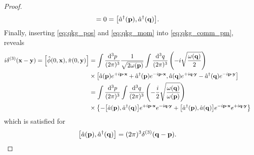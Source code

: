 \begin{proof}
\begin{equation*}
		=
		0
		=
		\comm{\hat{a}^\dagger(\vb{p})}{\hat{a}^\dagger(\vb{q})}
		.
	\end{equation*}
	Finally, inserting \cref{eq:qkg_pos} and \cref{eq:qkg_mom} into \cref{eq:qkg_comm_pm}, reveals
	\begin{equation*}
		\begin{split}
			i\delta^{(3)}(\vb{x}-\vb{y})
			=
			\comm{\hat\phi(0,\vb{x})}{\hat\pi(0,\vb{y})}
			&=
			\int\frac{\dd[3]{p}}{(2\pi)^3}
			\frac{1}{\sqrt{2\omega(\vb{p})}}
			\int\frac{\dd[3]{q}}{(2\pi)^3}
			\left(
				-i
				\sqrt{\frac{\omega(\vb{q})}{2}}
			\right)
			\\
			&\times
			\comm{
				\hat{a}(\vb{p})
				e^{+i\vb{p}\vdot\vb{x}}
				+
				\hat{a}^\dagger(\vb{p})
				e^{-i\vb{p}\vdot\vb{x}}
			}{
				\hat{a}(\vb{q})
				e^{+i\vb{q}\vdot\vb{y}}
				-
				\hat{a}^\dagger(\vb{q})
				e^{-i\vb{p}\vdot\vb{y}}
			}
			\\
			&=
			\int\frac{\dd[3]{p}}{(2\pi)^3}
			\int\frac{\dd[3]{q}}{(2\pi)^3}
			\left(
				-
				\frac{i}{2}
				\sqrt{\frac{\omega(\vb{q})}{\omega(\vb{p})}}
			\right)
			\\
			&\times
			\left\{
				-
				\comm{\hat{a}(\vb{p})}{\hat{a}^\dagger(\vb{q})}
				e^{+i\vb{p}\vdot\vb{x}}
				e^{-i\vb{q}\vdot\vb{y}}
				+
				\comm{\hat{a}^\dagger(\vb{p})}{\hat{a}(\vb{q})}
				e^{-i\vb{p}\vdot\vb{x}}
				e^{+i\vb{q}\vdot\vb{y}}
			\right\}
		\end{split}
	\end{equation*}
	which is satisfied for
	\begin{equation*}
		\comm{\hat{a}(\vb{p})}{\hat{a}^\dagger(\vb{q})}
		=
		(2\pi)^3
		\delta^{(3)}(\vb{q}-\vb{p})
		.
	\end{equation*}
\end{proof}

